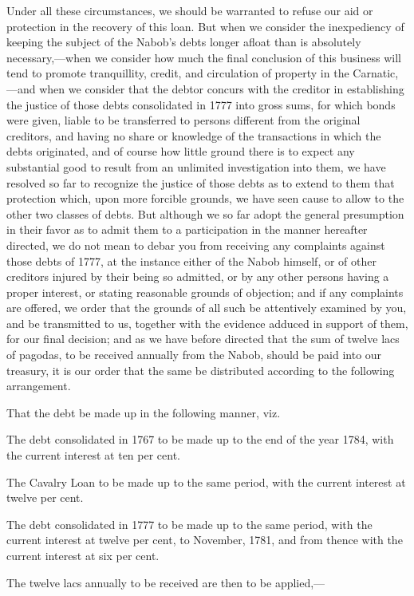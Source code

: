 Under all these circumstances, we should be warranted to refuse our aid or protection in the recovery of this loan. But when we consider the inexpediency of keeping the subject of the Nabob's debts longer afloat than is absolutely necessary,—when we consider how much the final conclusion of this business will tend to promote tranquillity, credit, and circulation of property in the Carnatic,—and when we consider that the debtor concurs with the creditor in establishing the justice of those debts consolidated in 1777 into gross sums, for which bonds were given, liable to be transferred to persons different from the original creditors, and having no share or knowledge of the transactions in which the debts originated, and of course how little ground there is to expect any substantial good to result from an unlimited investigation into them, we have resolved so far to recognize the justice of those debts as to extend to them that protection which, upon more forcible grounds, we have seen cause to allow to the other two classes of debts. But although we so far adopt the general presumption in their favor as to admit them to a participation in the manner hereafter directed, we do not mean to debar you from receiving any complaints against those debts of 1777, at the instance either of the Nabob himself, or of other creditors injured by their being so admitted, or by any other persons having a proper interest, or stating reasonable grounds of objection; and if any complaints are offered, we order that the grounds of all such be attentively examined by you, and be transmitted to us, together with the evidence adduced in support of them, for our final decision; and as we have before directed that the sum of twelve lacs of pagodas, to be received annually from the Nabob, should be paid into our treasury, it is our order that the same be distributed according to the following arrangement.

That the debt be made up in the following manner, viz.

The debt consolidated in 1767 to be made up to the end of the year 1784, with the current interest at ten per cent.

The Cavalry Loan to be made up to the same period, with the current interest at twelve per cent.

The debt consolidated in 1777 to be made up to the same period, with the current interest at twelve per cent, to November, 1781, and from thence with the current interest at six per cent.

The twelve lacs annually to be received are then to be applied,—

